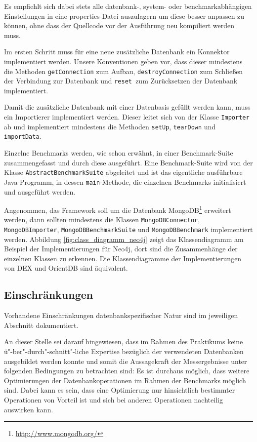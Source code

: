 \documentclass[11pt, a4paper, oneside]{article} %
\begin{document}
Es empfiehlt sich dabei stets alle datenbank-, system- oder benchmarkabhängigen Einstellungen in eine properties-Datei auszulagern um diese besser anpassen zu können, ohne dass der Quellcode vor der Ausführung neu kompiliert werden muss.

Im ersten Schritt muss für eine neue zusätzliche Datenbank ein Konnektor implementiert werden. Unsere Konventionen geben vor, dass dieser mindestens die Methoden \texttt{getConnection} zum Aufbau, \texttt{destroyConnection} zum Schließen der Verbindung zur Datenbank und \texttt{reset }zum Zurücksetzen der Datenbank implementiert.

Damit die zusätzliche Datenbank mit einer Datenbasis gefüllt werden kann, muss ein Importierer implementiert werden. Dieser leitet sich von der Klasse \texttt{Importer} ab und implementiert mindestens die Methoden \texttt{setUp}, \texttt{tearDown} und \texttt{importData}.

Einzelne Benchmarks werden, wie schon erwähnt, in einer Benchmark-Suite zusammengefasst und durch diese ausgeführt. Eine Benchmark-Suite wird von der Klasse  \linebreak \texttt{AbstractBenchmarkSuite} abgeleitet und ist das eigentliche ausführbare Java-Programm, in dessen \texttt{main}-Methode, die einzelnen Benchmarks initialisiert und ausgeführt werden.

Angenommen, das Framework soll um die Datenbank MongoDB\footnote{\url{http://www.mongodb.org/}} erweitert werden, dann sollten mindestens die Klassen \texttt{MongoDBConnector}, \texttt{MongoDBImporter}, \texttt{MongoDBBenchmarkSuite} und \texttt{MongoDBBenchmark} implementiert werden. Abbildung \ref{fig:class_diagramm_neo4j} zeigt das Klassendiagramm am Beispiel der Implementierungen für Neo4j, dort sind die Zusammenhänge der einzelnen Klassen zu erkennen. Die Klassendiagramme der Implementierungen von DEX und OrientDB sind äquivalent.

\subsection{Einschränkungen}

Vorhandene Einschränkungen datenbankspezifischer Natur sind im jeweiligen Abschnitt dokumentiert.

An dieser Stelle sei darauf hingewiesen, dass im Rahmen des Praktikums keine ü"-ber"-durch"-schnitt"-liche Expertise bezüglich der verwendeten Datenbanken ausgebildet werden konnte und somit die Aussagekraft der Messergebnisse unter folgenden Bedingungen zu betrachten sind: Es ist durchaus möglich, dass weitere Optimierungen der Datenbankoperationen im Rahmen der Benchmarks möglich sind. Dabei kann es sein, dass eine Optimierung nur hinsichtlich bestimmter Operationen von Vorteil ist und sich bei anderen Operationen nachteilig auswirken kann.
\end{document}
